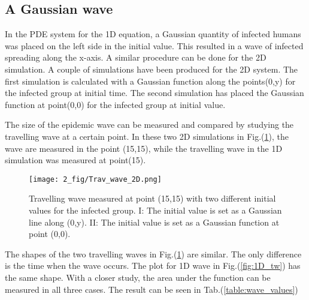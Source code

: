 \documentclass[%
twoside,                 %
final,                   %
chapterprefix=true,      %
open=right               %
10pt]{book}
\begin{document}
\subsection{A Gaussian wave}
In the PDE system for the 1D equation, a Gaussian quantity of infected humans was placed on the left side in the initial value. This resulted in a wave of infected spreading along the x-axis. A similar procedure can be done for the 2D simulation. A couple of simulations have been produced for the 2D system. The first simulation is calculated with a Gaussian function along the points(0,y) for the infected group at initial time. The second simulation has placed the Gaussian function at point(0,0) for the infected group at initial value. 


\vspace{3mm}




\vspace{3mm}


The size of the epidemic wave can be measured and compared by studying the travelling wave at a certain point. In these two 2D simulations in Fig.(\ref{fig:2D_trav_wave}), the wave are measured in the point (15,15), while the travelling wave in the 1D simulation was measured at point(15). 


\begin{figure}[ht]
  \centerline{\texttt{[image: 2\_fig/Trav\_wave\_2D.png]}}
  \caption{
  \label{fig:2D_trav_wave} Travelling wave measured at point (15,15) with two different initial values for the infected group. I: The initial value is set as a Gaussian line along (0,y). II: The initial value is set as a Gaussian function at point (0,0).
  }
\end{figure}




\vspace{3mm}




\vspace{3mm}


The shapes of the two travelling waves in Fig.(\ref{fig:2D_trav_wave}) are similar. The only difference is the time when the wave occurs. The plot for 1D wave in Fig.(\ref{fig:1D_tw}) has the same shape. With a closer study, the area under the function can be measured in all three cases. The result can be seen in Tab.(\ref{table:wave_values})   

\end{document}
